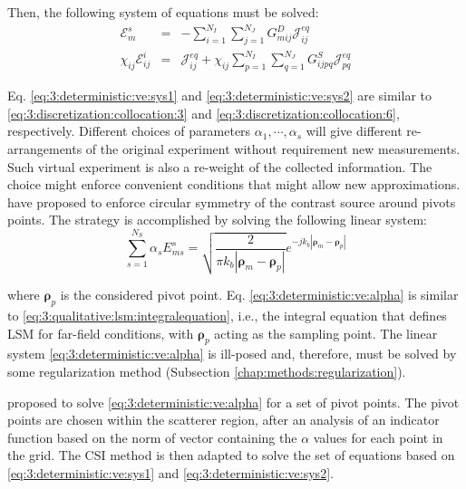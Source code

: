 			Then, the following system of equations must be solved:
			\begin{eqnarray}
					\mathscr{E}^s_m &=& - \sum\limits_{i=1}^{N_I}\sum\limits_{j=1}^{N_J} G^D_{mij} \mathscr{J}^{eq}_{ij} \label{eq:3:deterministic:ve:sys1} \\
					\chi_{ij}\mathscr{E}^i_{ij} &=& \mathscr{J}^{eq}_{ij} + \chi_{ij}\sum\limits_{p=1}^{N_I}\sum\limits_{q=1}^{N_J} G^S_{ijpq} \mathscr{J}^{eq}_{pq} \label{eq:3:deterministic:ve:sys2}
			\end{eqnarray}
			
			Eq. \eqref{eq:3:deterministic:ve:sys1} and \eqref{eq:3:deterministic:ve:sys2} are similar to \eqref{eq:3:discretization:collocation:3} and \eqref{eq:3:discretization:collocation:6}, respectively. Different choices of parameters $\alpha_1, \cdots, \alpha_s$ will give different re-arrangements of the original experiment without requirement new measurements. Such virtual experiment is also a re-weight of the collected information. The choice might enforce convenient conditions that might allow new approximations. \cite{donato2015inverse} have proposed to enforce circular symmetry of the contrast source around pivots points. The strategy is accomplished by solving the following linear system:
			\begin{equation}
				\sum\limits_{s=1}^{N_S} \alpha_s E^s_{ms} = \sqrt{\frac{2}{\pi k_b |\boldsymbol{\rho}_m-\boldsymbol{\rho}_p|}} e^{-jk_b|\boldsymbol{\rho}_m-\boldsymbol{\rho}_p|} \label{eq:3:deterministic:ve:alpha}
			\end{equation}
		
			\noindent where $\boldsymbol{\rho}_p$ is the considered pivot point. Eq. \eqref{eq:3:deterministic:ve:alpha} is similar to \eqref{eq:3:qualitative:lsm:integralequation}, i.e., the integral equation that defines LSM for far-field conditions, with $\boldsymbol{\rho}_p$ acting as the sampling point. The linear system \eqref{eq:3:deterministic:ve:alpha} is ill-posed and, therefore, must be solved by some regularization method (Subsection \ref{chap:methods:regularization}).
			
			\cite{donato2015inverse} proposed to solve \eqref{eq:3:deterministic:ve:alpha} for a set of pivot points. The pivot points are chosen within the scatterer region, after an analysis of an indicator function based on the norm of vector containing the $\alpha$ values for each point in the grid. The CSI method is then adapted to solve the set of equations based on \eqref{eq:3:deterministic:ve:sys1} and \eqref{eq:3:deterministic:ve:sys2}.
			
